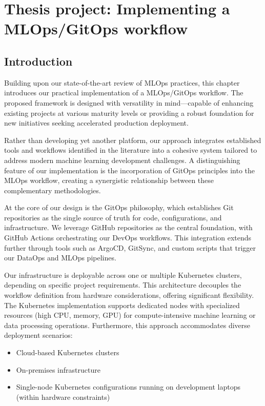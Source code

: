 \chapter{Thesis project: Implementing a MLOps/GitOps workflow}\label{ch:thesis-project:-a-standard-mlops-ci/cd-workflow}
\section{Introduction}\label{sec:introduction}
Building upon our state-of-the-art review of MLOps practices, this chapter introduces our practical implementation of a MLOps/GitOps workflow.
The proposed framework is designed with versatility in mind—capable of enhancing existing projects at various maturity levels or providing a robust foundation for new initiatives seeking accelerated production deployment.

Rather than developing yet another platform, our approach integrates established tools and workflows identified in the literature into a cohesive system tailored to address modern machine learning development challenges.
A distinguishing feature of our implementation is the incorporation of GitOps principles into the MLOps workflow, creating a synergistic relationship between these complementary methodologies.

At the core of our design is the GitOps philosophy, which establishes Git repositories as the single source of truth for code, configurations, and infrastructure.
We leverage GitHub repositories as the central foundation, with GitHub Actions orchestrating our DevOps workflows.
This integration extends further through tools such as ArgoCD, GitSync, and custom scripts that trigger our DataOps and MLOps pipelines. %

Our infrastructure is deployable across one or multiple Kubernetes clusters, depending on specific project requirements.
This architecture decouples the workflow definition from hardware considerations, offering significant flexibility.
The Kubernetes implementation supports dedicated nodes with specialized resources (high CPU, memory, GPU) for compute-intensive machine learning or data processing operations.
Furthermore, this approach accommodates diverse deployment scenarios:

\begin{itemize}
\item Cloud-based Kubernetes clusters
\item On-premises infrastructure
\item Single-node Kubernetes configurations running on development laptops (within hardware constraints)
\end{itemize}

